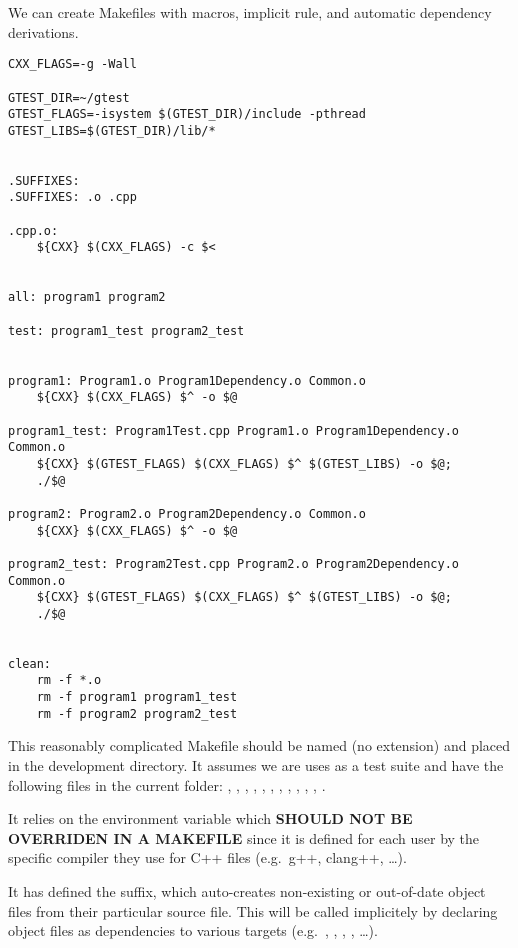 \documentclass[12pt]{article}
\begin{document}
We can create Makefiles with macros, implicit rule, and automatic dependency derivations.

\begin{verbatim}
CXX_FLAGS=-g -Wall

GTEST_DIR=~/gtest
GTEST_FLAGS=-isystem $(GTEST_DIR)/include -pthread
GTEST_LIBS=$(GTEST_DIR)/lib/*


.SUFFIXES:
.SUFFIXES: .o .cpp

.cpp.o:
    ${CXX} $(CXX_FLAGS) -c $<


all: program1 program2

test: program1_test program2_test


program1: Program1.o Program1Dependency.o Common.o
    ${CXX} $(CXX_FLAGS) $^ -o $@

program1_test: Program1Test.cpp Program1.o Program1Dependency.o Common.o
    ${CXX} $(GTEST_FLAGS) $(CXX_FLAGS) $^ $(GTEST_LIBS) -o $@;
    ./$@

program2: Program2.o Program2Dependency.o Common.o
    ${CXX} $(CXX_FLAGS) $^ -o $@

program2_test: Program2Test.cpp Program2.o Program2Dependency.o Common.o
    ${CXX} $(GTEST_FLAGS) $(CXX_FLAGS) $^ $(GTEST_LIBS) -o $@;
    ./$@


clean:
    rm -f *.o
    rm -f program1 program1_test
    rm -f program2 program2_test
\end{verbatim}

This reasonably complicated Makefile should be named  (no extension) and placed in the development directory. It assumes we are uses  as a test suite and have the following files in the current folder: , , , , , , , , , , , 
.

It relies on the  environment variable which {\bf SHOULD NOT BE OVERRIDEN IN A MAKEFILE} since it is defined for each user by the specific compiler they use for C++ files (e.g.\ g++, clang++, \dots).

It has defined the  suffix, which auto-creates non-existing or out-of-date object files from their particular source file. This will be called implicitely by declaring object files as dependencies to various targets (e.g.\ , , , , \dots).
\end{document}
